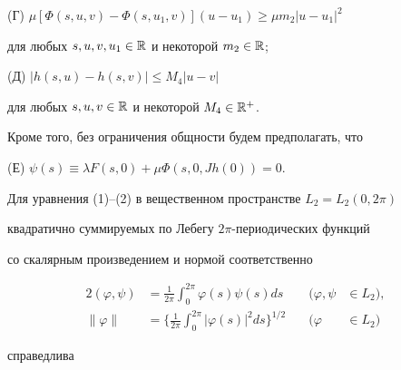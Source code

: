 (Г) $\mu[\Phi(s,u,v)-\Phi(s,u_1,v)](u-u_1)\geq \mu m_2 |u-u_1|^2$





\noindent{}для любых $s,u,v,u_1\in \Bbb R$ и некоторой $m_2\in \Bbb R$;





(Д) $|h(s,u)-h(s,v)|\leq M_4 |u-v|$





\noindent{}для любых $s,u,v\in \Bbb R$ и некоторой $M_4\in \Bbb R^+$.





Кроме того, без ограничения общности будем предполагать, что





(Е) $\psi(s)\equiv \lambda F(s,0)+\mu \Phi(s,0,Jh(0))=0$.





Для уравнения (1)--(2) в вещественном пространстве $L_2=L_2(0,2\pi)$


квадратично суммируемых по Лебегу $2\pi$-периодических функций


со скалярным произведением и нормой соответственно


\begin{alignat*}{2}


(\varphi,\psi)&=\frac{1}{2\pi}\int_0^{2\pi}\varphi(s)\psi(s) ds


&\quad (\varphi,\psi&\in L_2), \\


%


\|\varphi\|&=\bigg\{ \frac{1}{2\pi}\int_0^{2\pi}|\varphi(s)|^2


ds\bigg\}^{1/2}


&\quad (\varphi&\in L_2)


\end{alignat*}


справедлива 






